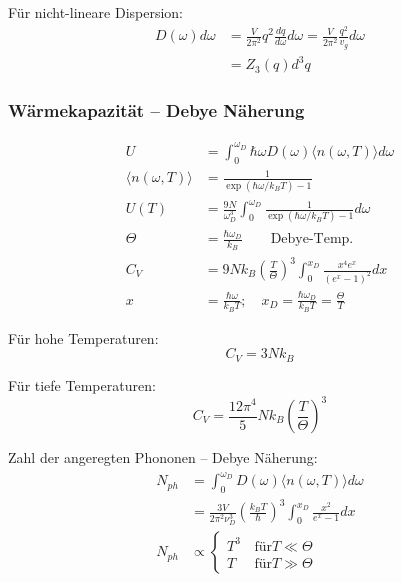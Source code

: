 Für nicht-lineare Dispersion:
\begin{equation*}
    \begin{aligned}
        D(\omega)d \omega &= \frac{V}{2 \pi^2} q^2 \frac{dq}{d\omega} d\omega = \frac{V}{2 \pi^2} \frac{q^2}{v_g} d\omega \\
        &= Z_3(q) d^3q
    \end{aligned}
\end{equation*}

\subsubsection*{Wärmekapazität – Debye Näherung}
\begin{equation*}
    \begin{aligned}
        U &= \int_0^{\omega_D} \hbar \omega D(\omega) \langle n(\omega, T) \rangle d\omega \\
        \langle n(\omega,T) \rangle &= \frac{1}{\exp(\hbar \omega / k_B T) -1} \\
        U(T) &= \frac{9N}{\omega_D^3} \int_0^{\omega_D} \frac{1}{\exp(\hbar \omega / k_B T) -1} d\omega \\
        \Theta &= \frac{\hbar \omega_D}{k_B} \qquad \text{Debye-Temp.} \\
        C_V &= 9Nk_B \left(\frac{T}{\Theta}\right)^3 \int_0^{x_D} \frac{x^4 e^x}{(e^x -1)^2} dx \\
        x &= \frac{\hbar \omega}{k_B T}; \quad x_D = \frac{\hbar \omega_D}{k_B T} = \frac{\Theta}{T}
    \end{aligned}
\end{equation*}

Für hohe Temperaturen: 
\begin{equation*}
    C_V = 3N k_B
\end{equation*}

Für tiefe Temperaturen:
\begin{equation*}
    C_V = \frac{12 \pi^4}{5} N k_B \left(\frac{T}{\Theta}\right)^3
\end{equation*}

Zahl der angeregten Phononen – Debye Näherung:
\begin{equation*}
    \begin{aligned}
        N_{ph} &= \int_0^{\omega_D} D(\omega) \langle n (\omega,T) \rangle d\omega \\ 
        &= \frac{3V}{2 \pi^2 \nu_D^3} \left(\frac{k_B T}{\hbar}\right)^3 \int_0^{x_D} \frac{x^2}{e^x -1}dx \\
        N_{ph} &\propto \begin{cases}
            T^3 & \, \text{für} T \ll \Theta \\
            T &  \, \text{für} T \gg \Theta
            \end{cases} \\
    \end{aligned}
\end{equation*}

